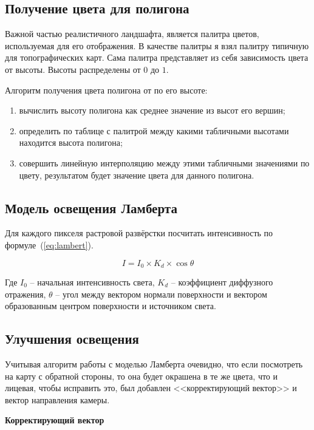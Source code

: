 \subsection{Получение цвета для полигона}

Важной частью реалистичного ландшафта, является палитра цветов, используемая для его отображения. В качестве палитры я взял палитру типичную для топографических карт. Сама палитра представляет из себя зависимость цвета от высоты. Высоты распределены от $0$ до $1$.

Алгоритм получения цвета полигона от по его высоте:

\begin{enumerate}
	\item вычислить высоту полигона как среднее значение из высот его вершин;
	\item определить по таблице с палитрой между какими табличными высотами находится высота полигона; 
	\item совершить линейную интерполяцию между этими табличными значениями по цвету, результатом будет значение цвета для данного полигона.
\end{enumerate}

\subsection{Модель освещения Ламберта}

Для каждого пикселя растровой развёрстки посчитать интенсивность по формуле~(\ref{eq:lambert}).

\begin{equation}
		I = I_0 \times K_d \times \cos{\theta}
	\label{eq:lambert}
\end{equation}

Где $I_0$ -- начальная интенсивность света, $K_d$ -- коэффициент диффузного отражения, $\theta$ -- угол между вектором нормали поверхности и вектором образованным центром поверхности и источником света.

\subsection{Улучшения освещения}
Учитывая алгоритм работы с моделью Ламберта очевидно, что если посмотреть на карту с обратной стороны, то она будет окрашена в те же цвета, что и лицевая, чтобы исправить это, был добавлен <<корректирующий вектор>> и вектор направления камеры.

{\bfseries Корректирующий вектор}

